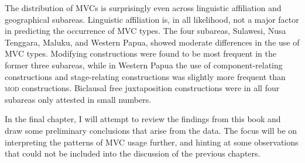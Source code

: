 The distribution of MVCs is surprisingly even across linguistic affiliation and geographical subareas. Linguistic affiliation is, in all likelihood, not a major factor in predicting the occurrence of MVC types. The four subareas, Sulawesi, Nusa Tenggara, Maluku, and Western Papua, showed moderate differences in the use of MVC types. Modifying constructions were found to be most frequent in the former three subareas, while in Western Papua the use of component-relating constructions and stage-relating constructions was slightly more frequent than \textsc{mod} constructions. Biclausal free juxtaposition constructions were in all four subareas only attested in small numbers. 

In the final chapter, I will attempt to review the findings from this book and draw some preliminary conclusions that arise from the data. The focus will be on interpreting the patterns of MVC usage further, and hinting at some observations that could not be included into the discussion of the previous chapters.
